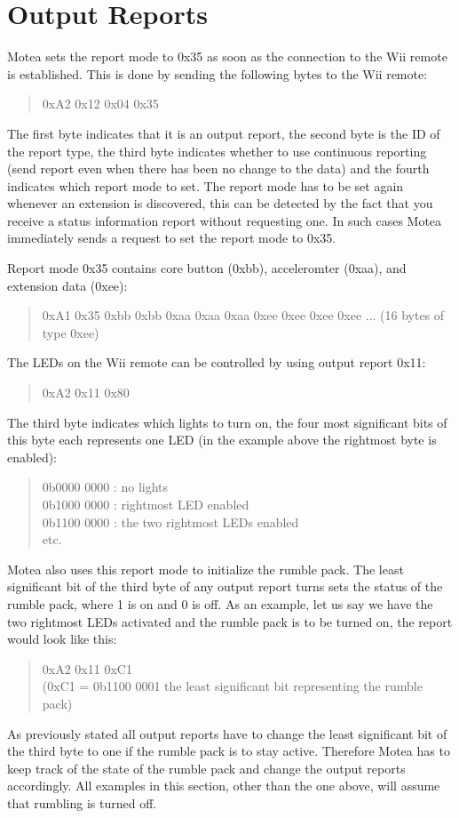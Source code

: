 \chapter{Output Reports}
\label{app:outputReports}
Motea sets the report mode to 0x35 as soon as the connection to the Wii remote is established. This is done by sending the following bytes to the Wii remote:
\begin{quote}
0xA2 0x12 0x04 0x35
\end{quote}
The first byte indicates that it is an output report, the second byte is the ID of the report type, the third byte indicates whether to use continuous reporting (send report even when there has been no change to the data) and the fourth indicates which report mode to set. The report mode has to be set again whenever an extension is discovered, this can be detected by the fact that you receive a status information report without requesting one. In such cases Motea immediately sends a request to set the report mode to 0x35.

Report mode 0x35 contains core button (0xbb), acceleromter (0xaa), and extension data (0xee):
\begin{quote}
0xA1 0x35 0xbb 0xbb 0xaa 0xaa 0xaa 0xee 0xee 0xee 0xee ... (16 bytes of type 0xee)
\end{quote}

The LEDs on the Wii remote can be controlled by using output report 0x11:
\begin{quote}
0xA2 0x11 0x80
\end{quote}
The third byte indicates which lights to turn on, the four most significant bits of this byte each represents one LED (in the example above the rightmost byte is enabled):
\begin{quote}
0b0000 0000 : no lights\\
0b1000 0000 : rightmost LED enabled\\
0b1100 0000 : the two rightmost LEDs enabled\\
etc.
\end{quote}
Motea also uses this report mode to initialize the rumble pack. The least significant bit of the third byte of any output report turns sets the status of the rumble pack, where 1 is on and 0 is off. As an example, let us say we have the two rightmost LEDs activated and the rumble pack is to be turned on, the report would look like this:
\begin{quote}	
0xA2 0x11 0xC1\\
(0xC1 = 0b1100 0001 the least significant bit representing the rumble pack)
\end{quote}
As previously stated all output reports have to change the least significant bit of the third byte to one if the rumble pack is to stay active. Therefore Motea has to keep track of the state of the rumble pack and change the output reports accordingly. All examples in this section, other than the one above, will assume that rumbling is turned off.

